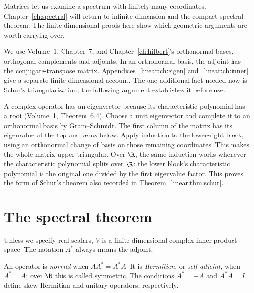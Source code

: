 Matrices let us examine a spectrum with finitely many coordinates. Chapter~\ref{ch:spectral} will return to infinite dimension and the compact spectral theorem. The finite-dimensional proofs here show which geometric arguments are worth carrying over.

\begin{reminder}
We use Volume~1, Chapter~7, and Chapter~\ref{ch:hilbert}'s orthonormal bases, orthogonal complements and adjoints. In an orthonormal basis, the adjoint has the conjugate-transpose matrix. Appendices~\ref{linear:ch:eigen} and~\ref{linear:ch:inner} give a separate finite-dimensional account. The one additional fact needed now is Schur's triangularisation; the following argument establishes it before use.
\end{reminder}

A complex operator has an eigenvector because its characteristic polynomial has a root (Volume~1, Theorem~6.4). Choose a unit eigenvector and complete it to an orthonormal basis by Gram--Schmidt. The first column of the matrix has its eigenvalue at the top and zeros below. Apply induction to the lower-right block, using an orthonormal change of basis on those remaining coordinates. This makes the whole matrix upper triangular. Over $\R$, the same induction works whenever the characteristic polynomial splits over $\R$: the lower block's characteristic polynomial is the original one divided by the first eigenvalue factor. This proves the form of Schur's theorem also recorded in Theorem~\ref{linear:thm:schur}.

\section{The spectral theorem}

Unless we specify real scalars, $V$ is a finite-dimensional complex inner product space. The notation $A^*$ always means the adjoint.

\begin{definition}\label{linear:def:normal}
An operator is \emph{normal} when $AA^*=A^*A$. It is \emph{Hermitian}, or \emph{self-adjoint}, when $A^*=A$; over $\R$ this is called symmetric. The conditions $A^*=-A$ and $A^*A=I$ define skew-Hermitian and unitary operators, respectively.
\end{definition}

